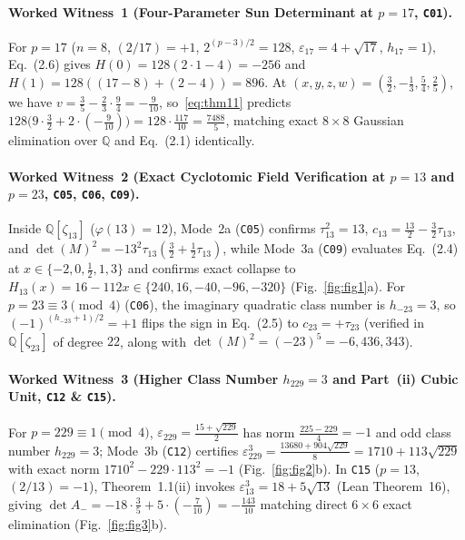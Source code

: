 \documentclass[10pt,twocolumn]{article}
\begin{document}
\paragraph{Worked Witness~1 (Four-Parameter Sun Determinant at $p=17$, \texttt{C01}).}
For $p=17$ ($n=8$, $(2/17)=+1$, $2^{(p-3)/2}=128$, $\varepsilon_{17}=4+\sqrt{17}$, $h_{17}=1$), Eq.~(2.6) gives $H(0) = 128(2\cdot 1 - 4) = -256$ and $H(1) = 128((17-8) + (2-4)) = 896$. At $(x,y,z,w) = (\tfrac{3}{2}, -\tfrac{1}{3}, \tfrac{5}{4}, \tfrac{2}{5})$, we have $v = \tfrac{3}{5} - \tfrac{2}{3}\cdot\tfrac{9}{4} = -\tfrac{9}{10}$, so~\eqref{eq:thm11} predicts $128\bigl(9\cdot\tfrac{3}{2} + 2\cdot(-\tfrac{9}{10})\bigr) = 128\cdot\tfrac{117}{10} = \tfrac{7488}{5}$, matching exact $8\times 8$ Gaussian elimination over $\mathbb{Q}$ and Eq.~(2.1) identically.

\paragraph{Worked Witness~2 (Exact Cyclotomic Field Verification at $p=13$ and $p=23$, \texttt{C05}, \texttt{C06}, \texttt{C09}).}
Inside $\mathbb{Q}[\zeta_{13}]$ ($\varphi(13)=12$), Mode~2a (\texttt{C05}) confirms $\tau_{13}^2 = 13$, $c_{13} = \tfrac{13}{2} - \tfrac{3}{2}\tau_{13}$, and $\det(M)^2 = -13^2\tau_{13}(\tfrac{3}{2}+\tfrac{1}{2}\tau_{13})$, while Mode~3a (\texttt{C09}) evaluates Eq.~(2.4) at $x\in\{-2,0,\tfrac{1}{2},1,3\}$ and confirms exact collapse to $H_{13}(x) = 16 - 112x \in \{240, 16, -40, -96, -320\}$ (Fig.~\ref{fig:fig1}a). For $p=23\equiv 3\pmod 4$ (\texttt{C06}), the imaginary quadratic class number is $h_{-23}=3$, so $(-1)^{(h_{-23}+1)/2}=+1$ flips the sign in Eq.~(2.5) to $c_{23} = +\tau_{23}$ (verified in $\mathbb{Q}[\zeta_{23}]$ of degree $22$, along with $\det(M)^2 = (-23)^5 = -6{,}436{,}343$).

\paragraph{Worked Witness~3 (Higher Class Number $h_{229}=3$ and Part~(ii) Cubic Unit, \texttt{C12} \& \texttt{C15}).}
For $p=229\equiv 1\pmod 4$, $\varepsilon_{229}=\tfrac{15+\sqrt{229}}{2}$ has norm $\tfrac{225-229}{4}=-1$ and odd class number $h_{229}=3$; Mode~3b (\texttt{C12}) certifies $\varepsilon_{229}^3 = \tfrac{13680 + 904\sqrt{229}}{8} = 1710 + 113\sqrt{229}$ with exact norm $1710^2 - 229\cdot 113^2 = -1$ (Fig.~\ref{fig:fig2}b). In \texttt{C15} ($p=13$, $(2/13)=-1$), Theorem~1.1(ii) invokes $\varepsilon_{13}^3 = 18 + 5\sqrt{13}$ (Lean Theorem~16), giving $\det A_- = -18\cdot\tfrac{3}{5} + 5\cdot(-\tfrac{7}{10}) = -\tfrac{143}{10}$ matching direct $6\times 6$ exact elimination (Fig.~\ref{fig:fig3}b).
\end{document}
